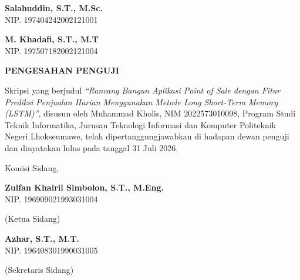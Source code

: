 \documentclass[12pt, a4paper, onecolumn, oneside]{report}
\begin{document}
\vspace{2cm}

\noindent
\begin{minipage}[t]{0.4\textwidth}
{\bfseries Salahuddin, S.T., M.Sc.}\\
NIP. 197404242002121001
\end{minipage}\hfill
\begin{minipage}[t]{0.4\textwidth}
{\bfseries M. Khadafi, S.T., M.T}\\
NIP. 197507182002121004
\end{minipage}

\newpage
{}
{}
\begin{center}
{\fontsize{14pt}{16pt}\selectfont\bfseries PENGESAHAN PENGUJI}
\end{center}
\vspace{0.5cm}

\noindent Skripsi yang berjudul \textit{``Rancang Bangun Aplikasi Point of Sale dengan Fitur Prediksi Penjualan Harian Menggunakan Metode Long Short-Term Memory (LSTM)''}, disusun oleh Muhammad Kholis, NIM 2022573010098, Program Studi Teknik Informatika, Jurusan Teknologi Informasi dan Komputer Politeknik Negeri Lhokseumawe, telah dipertanggungjawabkan di hadapan dewan penguji dan dinyatakan lulus pada tanggal 31 Juli 2026.

\vspace{0.5cm}

\begin{center}
Komisi Sidang,
\end{center}

\vspace{0.7cm}

\noindent
\begin{minipage}[t]{0.6\textwidth}
{\bfseries Zulfan Khairil Simbolon, S.T., M.Eng.}\\
NIP. 196909021993031004
\end{minipage}%
\begin{minipage}[t]{0.4\textwidth}
(Ketua Sidang)
\end{minipage}

\vspace{0.7cm}

\noindent
\begin{minipage}[t]{0.6\textwidth}
{\bfseries Azhar, S.T., M.T.}\\
NIP. 196408301990031005
\end{minipage}%
\begin{minipage}[t]{0.4\textwidth}
(Sekretaris Sidang)
\end{minipage}
\end{document}
